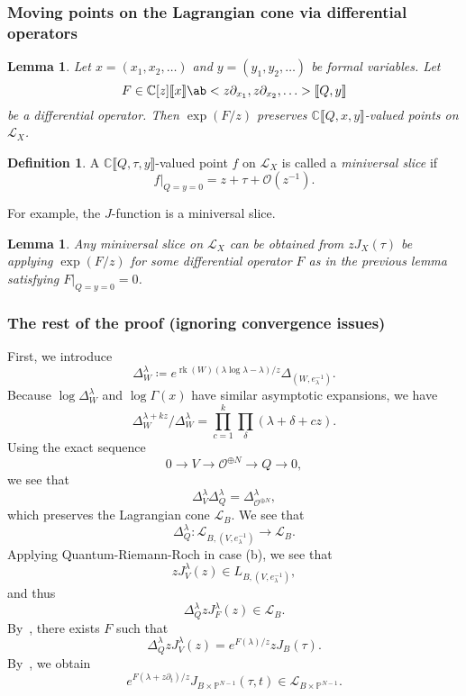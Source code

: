 \documentclass[leqno, openany]{memoir}
\newtheorem{lem}[thm]{Lemma}
\theoremstyle{definition}
\newtheorem{defn}[thm]{Definition}
\theoremstyle{remark}
\theoremstyle{plain}
\theoremstyle{definition}
\theoremstyle{remark}
\newcommand{\C}{\mathbb{C}}
\renewcommand{\P}{\mathbb{P}}
\newcommand{\mc}[1]{\mathcal{#1}}
\newcommand{\on}[1]{\operatorname{#1}}
\begin{document}
\subsubsection{Moving points on the Lagrangian cone via differential operators}%
\label{ssub:Moving points on the Lagrangian cone via differential operators}


\begin{lem}\label{lem:1}
    Let $x=(x_1,x_2,\ldots)$ and $y=(y_1,y_2,\ldots)$ be formal variables. Let 
    \[ F \in \C[z] \llbracket x \rrbracket \ab<z \partial_{x_1}, z \partial_{x_2},\ldots> \llbracket Q,y \rrbracket \]
    be a differential operator. Then $\exp(F/z)$ preserves $\C \llbracket Q,x,y \rrbracket$-valued points on $\mc{L}_X$.
\end{lem}

\begin{defn}
    A $\C\llbracket Q,\tau,y \rrbracket$-valued point $f$ on $\mc{L}_X$ is called a \textit{miniversal slice} if
    \[ f |_{Q=y=0} = z + \tau + \mc{O}(z^{-1}). \]
\end{defn}

For example, the $J$-function is a miniversal slice.

\begin{lem}\label{lem:2}
    Any miniversal slice on $\mc{L}_X$ can be obtained from $z J_X(\tau)$ be applying $\exp(F/z)$ for some differential operator $F$ as in the previous lemma satisfying $F|_{Q=y=0} = 0$.
\end{lem}

\subsubsection{The rest of the proof (ignoring convergence issues)}%
\label{ssub:The rest of the proof ignoring convergence issues}

First, we introduce
\[ \Delta_W^{\lambda} \coloneqq e^{\on{rk}(W) (\lambda \log \lambda - \lambda)/z} \Delta_{(W,e_{\lambda}^{-1})}. \]
Because $\log \Delta_W^{\lambda}$ and $\log \Gamma(x)$ have similar asymptotic expansions, we have
\[ \Delta_W^{\lambda + kz} / \Delta_W^{\lambda} = \prod_{c=1}^k \prod_{\delta} (\lambda + \delta + cz). \]
Using the exact sequence
\[ 0 \to V \to \mc{O}^{\oplus N} \to Q \to 0, \]
we see that
\[ \Delta_V^{\lambda} \Delta_Q^{\lambda} = \Delta_{\mc{O}^{\oplus N}}^{\lambda}, \]
which preserves the Lagrangian cone $\mc{L}_B$. We see that
\[ \Delta_Q^{\lambda} \colon \mc{L}_{B,(V, e_{\lambda}^{-1})} \to \mc{L}_B. \]
Applying Quantum-Riemann-Roch in case (b), we see that
\[ z J_V^{\lambda}(z) \in L_{B,(V, e_{\lambda}^{-1})}, \]
and thus
\[ \Delta_Q^{\lambda} z J_F^{\lambda}(z) \in \mc{L}_B. \]
By~, there exists $F$ such that
\[ \Delta_Q^{\lambda} z J_V^{\lambda}(z) = e^{F(\lambda)/z} z J_B(\tau). \]
By~, we obtain
\[ e^{F(\lambda + z \partial_t)/z} J_{B \times \P^{N-1}}(\tau, t) \in \mc{L}_{B \times \P^{N-1}}. \]
\end{document}
